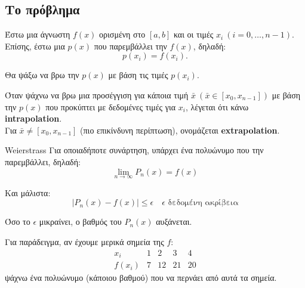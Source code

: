 \documentclass[11pt,a4paper,notitlepage,fleqn]{article}
\begin{document}
	\subsection{Το πρόβλημα}
	
	Έστω μια άγνωστη \( f(x) \) ορισμένη στο \( [a,b] \) και οι τιμές
	\( x_i\ (i=0,\dots,n-1) \). Επίσης, έστω μια \( p(x) \) που
	παρεμβάλλει την \( f(x) \), δηλαδή:
	\[
	p(x_i) = f(x_i).
	\]
	
	Θα ψάξω να βρω την \( p(x) \) με βάση τις τιμές \( p(x_i) \).
	
	Όταν ψάχνω να βρω μια προσέγγιση για κάποια τιμή \( \bar x \
	(\bar x \in \left[x_0,x_{n-1}\right]) \) με βάση την \( p(x) \) που
	προκύπτει με δεδομένες τιμές για \( x_i \), λέγεται ότι κάνω
	\textbf{intrapolation}. \\
	Για \( \bar x \neq \left[x_0,x_{n-1}\right] \) (πιο επικίνδυνη
	περίπτωση), ονομάζεται \textbf{extrapolation}.
	
	\begin{theorem}{}{Weierstrass}
		Για οποιαδήποτε συνάρτηση, υπάρχει ένα πολυώνυμο που την
		παρεμβάλλει, δηλαδή:
		\[
		\lim_{n\to \infty} P_n(x) = f(x)
		\]
	\end{theorem}
	
	Και μάλιστα:
	\[
	\left|P_n(x)-f(x)\right| \leq \epsilon \quad
	\text{$\epsilon$ δεδομένη ακρίβεια}
	\]
	
	Όσο το \( \epsilon \) μικραίνει, ο βαθμός του \( P_n(x) \) αυξάνεται.
	
	Για παράδειγμα, αν έχουμε μερικά σημεία της \( f \):
	\[
	\begin{array}{c|c|c|c|c}
	x_i & 1 & 2 & 3 & 4 \\ \hline
	f(x_i) & 7 & 12 & 21 & 20
	\end{array}
	\]
	ψάχνω ένα πολυώνυμο (κάποιου βαθμού) που να περνάει από αυτά τα
	σημεία.

	
\end{document}
